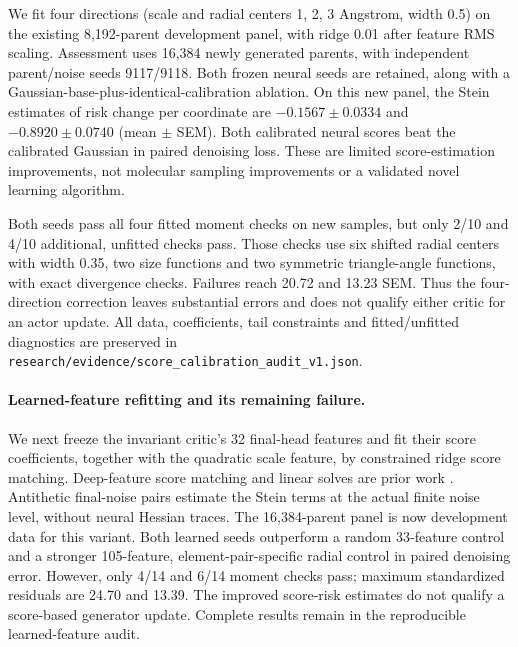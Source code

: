 We fit four directions (scale and radial centers 1, 2, 3 Angstrom, width 0.5)
on the existing 8,192-parent development panel, with ridge 0.01 after feature
RMS scaling. Assessment uses 16,384 newly generated parents, with independent
parent/noise seeds 9117/9118. Both frozen neural seeds are retained, along with
a Gaussian-base-plus-identical-calibration ablation. On this new panel,
the Stein estimates of risk change per coordinate are
$-0.1567\pm0.0334$ and $-0.8920\pm0.0740$ (mean $\pm$ SEM).
Both calibrated neural scores beat the calibrated Gaussian in paired denoising
loss. These are limited score-estimation improvements, not molecular sampling
improvements or a validated novel learning algorithm.

Both seeds pass all four fitted moment checks on new samples, but only 2/10
and 4/10 additional, unfitted checks pass. Those checks use six shifted radial
centers with width 0.35, two size functions and two symmetric triangle-angle
functions, with exact divergence checks. Failures reach 20.72 and 13.23 SEM.
Thus the four-direction correction leaves substantial errors and does not
qualify either critic for an actor update. All data, coefficients, tail
constraints and fitted/unfitted diagnostics are preserved in
\texttt{research/evidence/score\_calibration\_audit\_v1.json}.

\paragraph{Learned-feature refitting and its remaining failure.}
We next freeze the invariant critic's 32 final-head features and fit their
score coefficients, together with the quadratic scale feature, by constrained
ridge score matching. Deep-feature score matching and linear solves are prior
work \citep{wenliang2019deepkernels}. Antithetic final-noise pairs estimate the
Stein terms at the actual finite noise level, without neural Hessian traces.
The 16,384-parent panel is now development data for this variant. Both learned
seeds outperform a random 33-feature control and a stronger 105-feature,
element-pair-specific radial control in paired denoising error. However, only
4/14 and 6/14 moment checks pass; maximum standardized residuals are 24.70 and
13.39. The improved score-risk estimates do not qualify a score-based generator
update. Complete results remain in the reproducible learned-feature audit.

